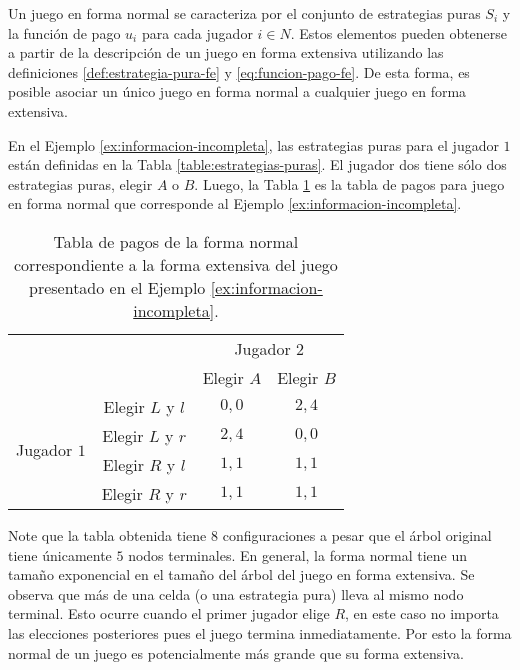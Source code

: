 Un juego en forma normal se caracteriza por el conjunto de estrategias puras $S_i$ y la función de pago $u_i$ para cada jugador $i\in N$. Estos elementos pueden obtenerse a partir de la descripción de un juego en forma extensiva utilizando las definiciones \ref{def:estrategia-pura-fe} y \ref{eq:funcion-pago-fe}. De esta forma, es posible asociar un único juego en forma normal a cualquier juego en forma extensiva.

En el Ejemplo \ref{ex:informacion-incompleta}, las estrategias puras para el jugador $1$ están definidas en la Tabla \ref{table:estrategias-puras}. El jugador dos tiene sólo dos estrategias puras, elegir $A$ o $B$. Luego, la Tabla \ref{table:fextensiva-a-fnormal} es la tabla de pagos para juego en forma normal que corresponde al Ejemplo \ref{ex:informacion-incompleta}.

\begin{table}[h]
\begin{center}
\caption[Forma normal de un juego en forma extensiva]{Tabla de pagos de la forma normal correspondiente a la forma extensiva del juego presentado en el Ejemplo \ref{ex:informacion-incompleta}.}
\label{table:fextensiva-a-fnormal}
\begin{tabular}{c c|c|c|}
\multicolumn{2}{c}{} & \multicolumn{2}{c}{Jugador $2$} \\ 
\multicolumn{2}{c}{} & \multicolumn{1}{c}{Elegir $A$} & \multicolumn{1}{c}{Elegir $B$} \\ \cline{3-4}
\multirow{4}{*}{Jugador $1$} & Elegir $L$ y $l$ & $0,0$ & $2,4$ \\ \cline{3-4}
& Elegir $L$ y $r$ & $2,4$ & $0,0$ \\ \cline{3-4}
& Elegir $R$ y $l$ & $1,1$ & $1,1$ \\ \cline{3-4}
& Elegir $R$ y $r$ & $1,1$ & $1,1$ \\ \cline{3-4}
\end{tabular}
\end{center}
\end{table}

Note que la tabla obtenida tiene $8$ configuraciones a pesar que el árbol original tiene únicamente $5$ nodos terminales. En general, la forma normal tiene un tamaño exponencial en el tamaño del árbol del juego en forma extensiva. Se observa que más de una celda (o una estrategia pura) lleva al mismo nodo terminal. Esto ocurre cuando el primer jugador elige $R$, en este caso no importa las elecciones posteriores pues el juego termina inmediatamente. Por esto la forma normal de un juego es potencialmente más grande que su forma extensiva.

